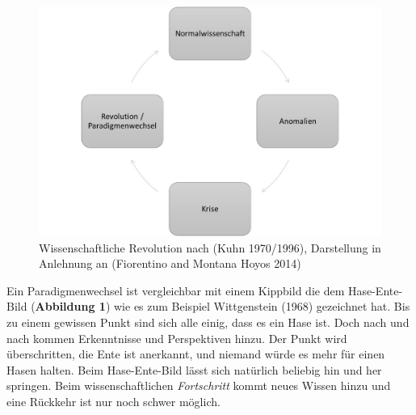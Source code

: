 \documentclass[
  letterpaper,
  DIV=11,
  numbers=noendperiod]{scrreprt}
\begin{document}
\begin{figure}[H]

{\centering \includegraphics{images/paradigmenwechsel.jpg}

}

\caption{Wissenschaftliche Revolution nach (Kuhn 1970/1996), Darstellung
in Anlehnung an (Fiorentino and Montana Hoyos 2014)}

\end{figure}%

Ein Paradigmenwechsel ist vergleichbar mit einem Kippbild die dem
Hase-Ente-Bild (\textbf{Abbildung 1}) wie es zum Beispiel Wittgenstein
(1968) gezeichnet hat. Bis zu einem gewissen Punkt sind sich alle einig,
dass es ein Hase ist. Doch nach und nach kommen Erkenntnisse und
Perspektiven hinzu. Der Punkt wird überschritten, die Ente ist
anerkannt, und niemand würde es mehr für einen Hasen halten. Beim
Hase-Ente-Bild lässt sich natürlich beliebig hin und her springen. Beim
wissenschaftlichen \emph{Fortschritt} kommt neues Wissen hinzu und eine
Rückkehr ist nur noch schwer möglich.
\end{document}
